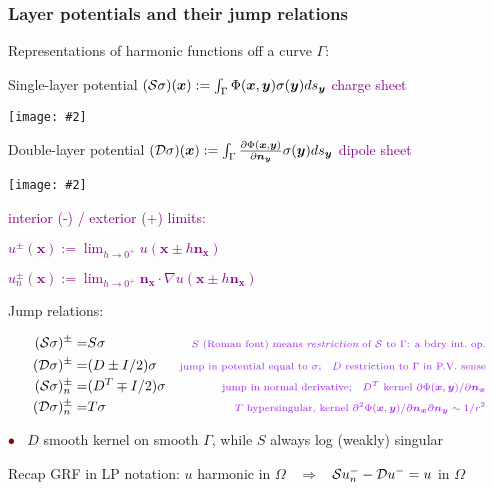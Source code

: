 \documentclass[t]{beamer}
\newcommand{\ft}[1]{\frametitle{#1}}
\newcommand{\bea}{\begin{eqnarray}}
\newcommand{\eea}{\end{eqnarray}}
\newcommand{\mbf}[1]{{\bm #1}}           %
\newcommand{\com}[1]{{\scriptsize \textcolor{purple}{#1}}}      %
\newcommand{\vg}{\vspace{2ex}}
\newcommand{\sg}{\vspace{1ex}}
\newcommand{\rb}{\ensuremath{\textcolor{darkred}{\bullet\;}}\ }
\newcommand{\bmp}[1]{\begin{minipage}{#1}}
\newcommand{\emp}{\end{minipage}}
\newcommand{\pig}[2]{\bmp{#1}\texttt{[image: \#2]}\emp} %
\newcommand{\xx}{\mbf{x}}
\newcommand{\yy}{\mbf{y}}
\newcommand{\nn}{\mbf{n}}
\newcommand{\Srep}{{\cal S}}
\newcommand{\Drep}{{\cal D}}
\begin{document}
\begin{noframe}\ft{Layer potentials and their jump relations}


  \bmp{4in}
  Representations of harmonic functions off a curve $\Gamma$:
\;\com{``density'' $\sigma$}
  
  \sg

  Single-layer potential
  $(\Srep\sigma)(\xx) := \int_\Gamma \Phi(\xx,\yy) \sigma(\yy) ds_\yy$
  \;
    \com{charge sheet}
  \emp
\hfill \pig{.6in}{figs/slp_lap}

  \bmp{4in}
  Double-layer potential
$(\Drep\sigma)(\xx) := \int_\Gamma \frac{\partial \Phi(\xx,\yy)}{\partial \nn_\yy}
  \sigma(\yy) ds_\yy$
  \com{dipole sheet}

  \vspace{4ex}

  \mbox{}
  \emp
\hfill \pig{.6in}{figs/dlp_lap}

\vspace{-4ex}
\pause

\bmp{1.9in}
\com{interior (-) / exterior (+) limits:}
\emp
\bmp{2.5in}
\com{
  $u^{\pm}(\xx) := \lim_{h\to 0^+} u(\xx \pm h\nn_\xx)$    \quad 
}

\com{
  $u_n^{\pm}(\xx) := \lim_{h\to 0^+} \nn_\xx \cdot \nabla u(\xx \pm h\nn_\xx)$
 }
\emp

\vg

{\large Jump relations:}

\vspace{-4ex}

\bea
(\Srep\sigma)^\pm =&  S\sigma
 & \mbox{\com{$S$ (Roman font) means {\em restriction} of $\Srep$ to $\Gamma$: a bdry int.\ op.}}
\nonumber\\
(\Drep\sigma)^\pm =&  (D\pm I/2) \sigma
& \mbox{\com{jump in potential equal to $\sigma$; \; $D$ restriction to $\Gamma$ in P.V. sense}}
\nonumber\\
(\Srep\sigma)_n^\pm =&  (D^T\mp I/2) \sigma
& \mbox{\com{jump in normal derivative; \; $D^T$ kernel
$\partial \Phi(\xx,\yy) / \partial \nn_\xx$}} %
\nonumber \\
(\Drep\sigma)_n^\pm =&  T \sigma
& \mbox{\com{$T$ hypersingular, kernel $\partial^2 \Phi(\xx,\yy) / \partial \nn_\xx \partial \nn_\yy \sim 1/r^2$}}
\nonumber
\eea

\vspace{-1ex}

\rb $D$ smooth kernel on smooth $\Gamma$, while $S$ always log (weakly) singular



\vg
\pause

Recap GRF in LP notation:
\hfill $u$ harmonic in $\Omega$
$\;\;\Rightarrow\;\;$
$\Srep u_n^- - \Drep u^- = u$ in $\Omega$




\end{noframe}
\end{document}
